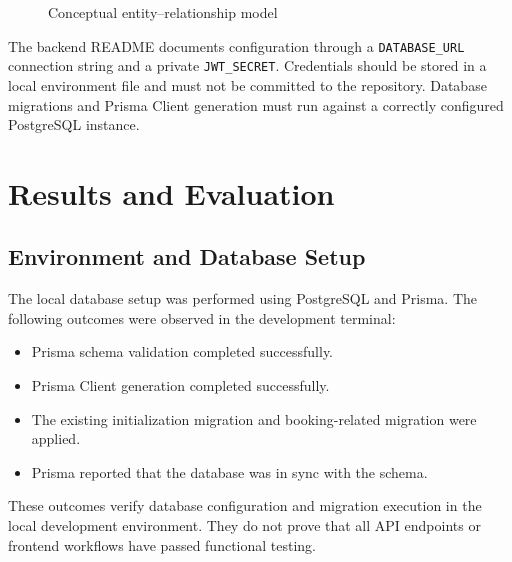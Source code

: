 \documentclass{tietreport}
\begin{document}
\begin{figure}[H]
\centering
{}
\caption{Conceptual entity--relationship model}
\label{fig:er-model}
\end{figure}

The backend README documents configuration through a \texttt{DATABASE\_URL} connection string and a private \texttt{JWT\_SECRET}. Credentials should be stored in a local environment file and must not be committed to the repository. Database migrations and Prisma Client generation must run against a correctly configured PostgreSQL instance.

\chapter{Results and Evaluation}
\section{Environment and Database Setup}
The local database setup was performed using PostgreSQL and Prisma. The following outcomes were observed in the development terminal:
\begin{itemize}
  \item Prisma schema validation completed successfully.
  \item Prisma Client generation completed successfully.
  \item The existing initialization migration and booking-related migration were applied.
  \item Prisma reported that the database was in sync with the schema.
\end{itemize}
These outcomes verify database configuration and migration execution in the local development environment. They do not prove that all API endpoints or frontend workflows have passed functional testing.
\end{document}
